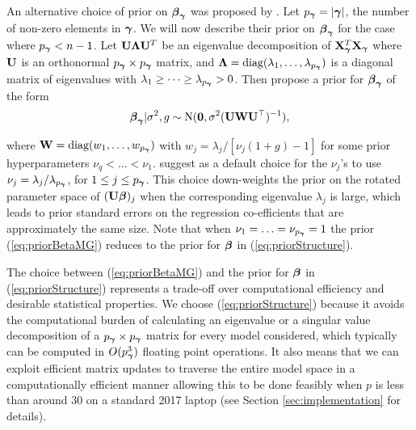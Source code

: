 An alternative choice of prior on ${\boldsymbol \beta}_{\boldsymbol \gamma}$ was proposed by
\cite{Maruyama2011}. Let $p_{{\boldsymbol \gamma}} = |{\boldsymbol \gamma}|$, the number of non-zero
elements in ${\boldsymbol \gamma}$. We will now describe their prior on ${\boldsymbol \beta}_{\boldsymbol \gamma}$ for
the case where $p_{{\boldsymbol \gamma}} < n - 1$. Let ${\bf U}{\boldsymbol \Lambda}{\bf U}^T$ be an eigenvalue
decomposition of ${\bf X}_{\boldsymbol \gamma}^T{\bf X}_{\boldsymbol \gamma}$ where ${\bf U}$ is an orthonormal
$p_{{\boldsymbol \gamma}} \times p_{{\boldsymbol \gamma}}$ matrix, and ${\boldsymbol \Lambda} =
\mbox{diag}(\lambda_1,\ldots,\lambda_{p_{{\boldsymbol \gamma}}})$ is a diagonal matrix of
eigenvalues with $\lambda_1 \ge \cdots \ge \lambda_{p_{{\boldsymbol \gamma}}}>0$. Then
\cite{Maruyama2011} propose a prior for ${\boldsymbol \beta}_{\boldsymbol \gamma}$ of the form
\begin{equation} \label{eq:priorBetaMG} {\boldsymbol\beta}_{\boldsymbol \gamma} | \sigma^2, g \sim
\text{N}({\bf 0}, \sigma^2 ({\bf U}{\bf W}{\bf U}^\top)^{-1}),   \end{equation} 

\noindent where ${\bf W} = \mbox{diag}(w_1,\ldots,w_{p_{{\boldsymbol \gamma}}})$ with $ w_j =
\lambda_j/[\nu_j(1 + g) - 1]$ for some prior hyperparameters $\nu_q < \ldots <
\nu_1$. \cite{Maruyama2011} suggest as a default choice for the $\nu_j$'s to
use $\nu_j = \lambda_j/\lambda_{p_{{\boldsymbol \gamma}}}$, for $1\le j \le p_{{\boldsymbol \gamma}}$.
This choice down-weights the prior on the rotated parameter space of $({\bf U}
{\boldsymbol \beta})_j$ when the corresponding eigenvalue $\lambda_j$ is large, which leads
to prior standard errors on the regression co-efficients that are approximately
the same size. Note that when $\nu_1 = \ldots = \nu_{p_{{\boldsymbol \gamma}}} = 1$ the
prior (\ref{eq:priorBetaMG}) reduces to the prior for ${\boldsymbol \beta}$ in
(\ref{eq:priorStructure}). 

The choice between (\ref{eq:priorBetaMG}) and the prior for ${\boldsymbol \beta}$ in
(\ref{eq:priorStructure}) represents a trade-off over computational efficiency
and desirable statistical properties. We choose (\ref{eq:priorStructure})
because it avoids the computational burden of calculating an eigenvalue or a
singular value decomposition of a $p_{{\boldsymbol \gamma}}\times p_{{\boldsymbol \gamma}}$ matrix for
every model considered, which typically can be computed in $O(p_{{\boldsymbol \gamma}}^3)$
floating point operations.  It also means that we can exploit efficient matrix
updates to traverse the entire model space in a computationally efficient
manner allowing this to be done feasibly when $p$ is less than around 30 on a
standard 2017 laptop (see Section \ref{sec:implementation} for details).


